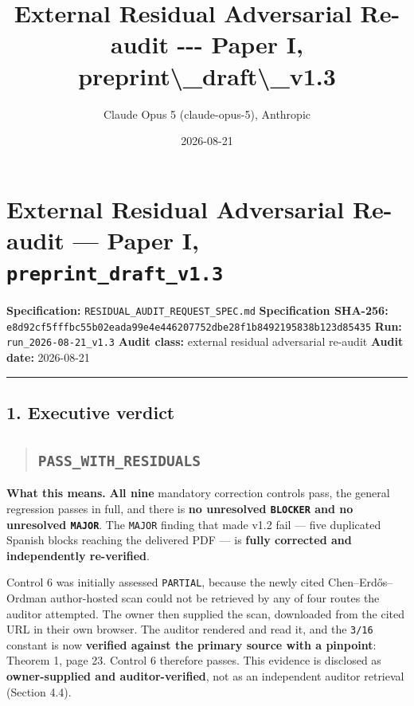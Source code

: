 \documentclass[
  9pt,
  a4paper,
]{article}
\title{External Residual Adversarial Re-audit -\/-\/- Paper I,
preprint\textbackslash\_draft\textbackslash\_v1.3}
\author{Claude Opus 5 (claude-opus-5), Anthropic}
\date{2026-08-21}
\begin{document}
\maketitle

\section{\texorpdfstring{External Residual Adversarial Re-audit ---
Paper I,
\texttt{preprint\_draft\_v1.3}}{External Residual Adversarial Re-audit --- Paper I, preprint\_draft\_v1.3}}\label{external-residual-adversarial-re-audit--paper-i-preprint_draft_v13}

\textbf{Specification:} \texttt{RESIDUAL\_AUDIT\_REQUEST\_SPEC.md}
\textbf{Specification SHA-256:}
\texttt{e8d92cf5fffbc55b02eada99e4e446207752dbe28f1b8492195838b123d85435}
\textbf{Run:} \texttt{run\_2026-08-21\_v1.3} \textbf{Audit class:}
external residual adversarial re-audit \textbf{Audit date:} 2026-08-21

\begin{center}\rule{0.5\linewidth}{0.5pt}\end{center}

\subsection{1. Executive verdict}\label{1-executive-verdict}

\begin{quote}
\mbox{}%
\subsection{\texorpdfstring{\texttt{PASS\_WITH\_RESIDUALS}}{PASS\_WITH\_RESIDUALS}}\label{pass_with_residuals}
\end{quote}

\textbf{What this means.} \textbf{All nine} mandatory correction
controls pass, the general regression passes in full, and there is
\textbf{no unresolved \texttt{BLOCKER} and no unresolved
\texttt{MAJOR}}. The \texttt{MAJOR} finding that made v1.2 fail --- five
duplicated Spanish blocks reaching the delivered PDF --- is
\textbf{fully corrected and independently re-verified}.

Control 6 was initially assessed \texttt{PARTIAL}, because the newly
cited Chen--Erdős--Ordman author-hosted scan could not be retrieved by
any of four routes the auditor attempted. The owner then supplied the
scan, downloaded from the cited URL in their own browser. The auditor
rendered and read it, and the \texttt{3/16} constant is now
\textbf{verified against the primary source with a pinpoint}: Theorem 1,
page 23. Control 6 therefore passes. This evidence is disclosed as
\textbf{owner-supplied and auditor-verified}, not as an independent
auditor retrieval (Section 4.4).
\end{document}
